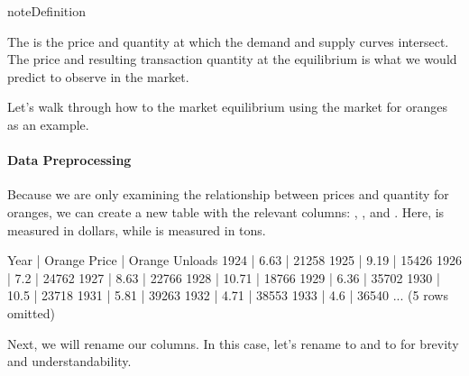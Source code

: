 \documentclass[letterpaper,10pt,english]{jupyterBook}
\begin{document}
\begin{sphinxadmonition}{note}{Definition}

\sphinxAtStartPar
The  is the price and quantity at which the demand and supply curves intersect. The price and resulting transaction quantity at the equilibrium is what we would predict to observe in the market.
\end{sphinxadmonition}

\sphinxAtStartPar
Let’s walk through how to the market equilibrium using the market for oranges as an example.


\paragraph{Data Preprocessing}
\label{\detokenize{content/02-supply/03-market-equilibria:data-preprocessing}}
\sphinxAtStartPar
Because we are only examining the relationship between prices and quantity for oranges, we can create a new table with the relevant columns: , , and . Here,  is measured in dollars, while  is measured in tons.

\begin{sphinxVerbatim}[commandchars=\\\{\}]
    
\end{sphinxVerbatim}

\begin{sphinxVerbatim}[commandchars=\\\{\}]
Year | Orange Price | Orange Unloads
1924 | 6.63         | 21258
1925 | 9.19         | 15426
1926 | 7.2          | 24762
1927 | 8.63         | 22766
1928 | 10.71        | 18766
1929 | 6.36         | 35702
1930 | 10.5         | 23718
1931 | 5.81         | 39263
1932 | 4.71         | 38553
1933 | 4.6          | 36540
... (5 rows omitted)
\end{sphinxVerbatim}

\sphinxAtStartPar
Next, we will rename our columns. In this case, let’s rename  to  and  to  for brevity and understandability.
\end{document}
